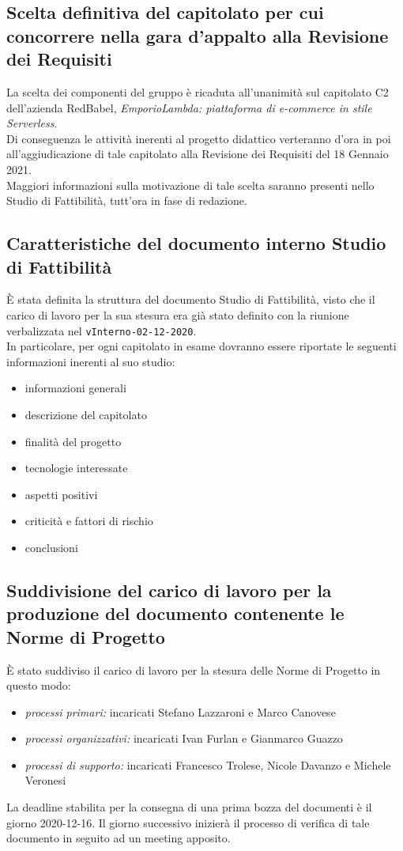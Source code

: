 \subsection{Scelta definitiva del capitolato per cui concorrere nella gara d'appalto alla Revisione dei Requisiti}
	La scelta dei componenti del gruppo è ricaduta all'unanimità sul capitolato C2 dell'azienda RedBabel, \textit{EmporioLambda: piattaforma di e-commerce in stile Serverless}.\\
	Di conseguenza le attività inerenti al progetto didattico verteranno d'ora in poi all'aggiudicazione di tale capitolato alla Revisione dei Requisiti del 18 Gennaio 2021.\\
	Maggiori informazioni sulla motivazione di tale scelta saranno presenti nello Studio di Fattibilità, tutt'ora in fase di redazione.
	
	\subsection{Caratteristiche del documento interno Studio di Fattibilità}
	È stata definita la struttura del documento Studio di Fattibilità, visto che il carico di lavoro per la sua stesura era già stato definito con la riunione verbalizzata nel \verb|vInterno-02-12-2020|.\\
	In particolare, per ogni capitolato in esame dovranno essere riportate le seguenti informazioni inerenti al suo studio:
	\begin{itemize}
		\item informazioni generali
		\item descrizione del capitolato
		\item finalità del progetto
		\item tecnologie interessate
		\item aspetti positivi
		\item criticità e fattori di rischio
		\item conclusioni
	\end{itemize}
	
	\subsection{Suddivisione del carico di lavoro per la produzione del documento contenente le Norme di Progetto}
	È stato suddiviso il carico di lavoro per la stesura delle Norme di Progetto in questo modo:
	\begin{itemize}
		\item \textit{processi primari:} incaricati Stefano Lazzaroni e Marco Canovese
		\item \textit{processi organizzativi:} incaricati Ivan Furlan e Gianmarco Guazzo
		\item \textit{processi di supporto:} incaricati Francesco Trolese, Nicole Davanzo e Michele Veronesi
	\end{itemize}
	La deadline stabilita per la consegna di una prima bozza del documenti è il giorno 2020-12-16. Il giorno successivo inizierà il processo di verifica di tale documento in seguito ad un meeting apposito.

